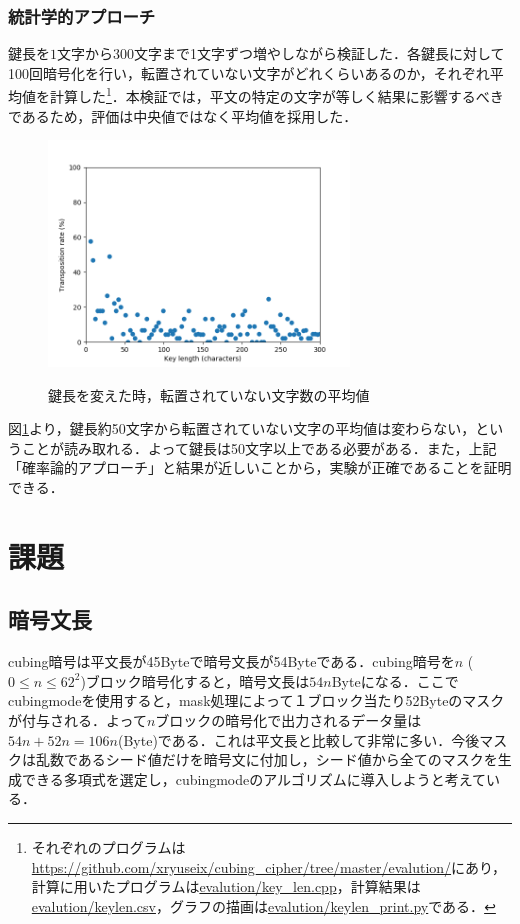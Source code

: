 \documentclass[a4j,titlepage]{jsarticle}
\begin{document}
\subsubsection{統計学的アプローチ}
鍵長を\(1\)文字から\(300\)文字まで1文字ずつ増やしながら検証した．各鍵長に対して100回暗号化を行い，転置されていない文字がどれくらいあるのか，それぞれ平均値を計算した\footnote{それぞれのプログラムは\url{https://github.com/xryuseix/cubing_cipher/tree/master/evalution/}にあり，計算に用いたプログラムは\url{evalution/key_len.cpp}，計算結果は\url{evalution/keylen.csv}，グラフの描画は\url{evalution/keylen_print.py}である．}．本検証では，平文の特定の文字が等しく結果に影響するべきであるため，評価は中央値ではなく平均値を採用した．
\begin{figure}
  \centering
  \includegraphics[width=8cm]{./tex_pic/figure.png}\\
  \caption{鍵長を変えた時，転置されていない文字数の平均値}
  \label{fig:key-len}
\end{figure}
図\ref{fig:key-len}より，鍵長約50文字から転置されていない文字の平均値は変わらない，ということが読み取れる．よって鍵長は50文字以上である必要がある．また，上記「確率論的アプローチ」と結果が近しいことから，実験が正確であることを証明できる．

\section{課題}
\subsection{暗号文長}
cubing暗号は平文長が45Byteで暗号文長が54Byteである．cubing暗号を\(n\) (\(0 \leq n \leq 62^2\))ブロック暗号化すると，暗号文長は\(54n\)Byteになる．ここでcubingmodeを使用すると，mask処理によって１ブロック当たり52Byteのマスクが付与される．よって\(n\)ブロックの暗号化で出力されるデータ量は\(54n+52n=106n\)(Byte)である．これは平文長と比較して非常に多い．今後マスクは乱数であるシード値だけを暗号文に付加し，シード値から全てのマスクを生成できる多項式を選定し，cubingmodeのアルゴリズムに導入しようと考えている．
\end{document}
